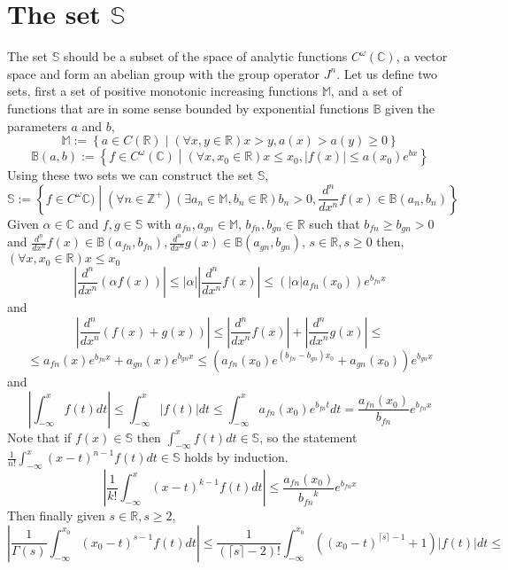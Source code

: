 \documentclass[%
 onecolumn,
 amsmath, amssymb, aps, pra, 10pt
]{revtex4-2}
\begin{document}
\appendix*

\section{The set $\mathbb{S}$}
The set $\mathbb{S}$ should be a subset of the space of analytic functions $C^\omega(\mathbb{C})$, a vector space and form an abelian group with the group operator $J^n$. Let us define two sets, first a set of positive monotonic increasing functions $\mathbb{M}$, and a set of functions that are in some sense bounded by exponential functions $\mathbb{B}$ given the parameters $a$ and $b$,
\[\mathbb{M} := \left\lbrace a \in C(\mathbb{R}) \middle| (\forall x, y \in \mathbb{R}) x > y, a(x) > a(y) \geq 0 \right\rbrace\]
\[\mathbb{B}(a, b) := \left\lbrace f \in C^\omega(\mathbb{C}) \middle| (\forall x, x_0 \in \mathbb{R}) x \leq x_0, |f(x)| \leq a(x_0)e^{bx} \right\rbrace\]
Using these two sets we can construct the set $\mathbb{S}$,
\[
\mathbb{S} := \left\lbrace f \in C^\omega\mathbb{C}) \middle| (\forall n \in \mathbb{Z}^+)(\exists a_n \in \mathbb{M}, b_n \in \mathbb{R}) b_n > 0, \frac{d^n}{dx^n}f(x) \in \mathbb{B}(a_n, b_n) \right\rbrace
\]
Given $\alpha \in \mathbb{C}$ and $f, g \in \mathbb{S}$ with $a_{fn}, a_{gn} \in \mathbb{M}$, $ b_{fn}, b_{gn} \in \mathbb{R}$ such that $b_{fn} \geq b_{gn} > 0$ and $\frac{d^n}{dx^n} f(x) \in \mathbb{B}(a_{fn}, b_{fn}), \frac{d^n}{dx^n} g(x) \in \mathbb{B}(a_{gn}, b_{gn})$, $s \in \mathbb{R}, s \geq 0$ then, $(\forall x, x_0 \in \mathbb{R}) x \leq x_0$
\[\left|\frac{d^n}{dx^n} (\alpha f(x))\right| \leq |\alpha| \left|\frac{d^n}{dx^n}f(x)\right| \leq (|\alpha| a_{fn}(x_0))e^{b_{fn}x}\]
and
\[\left|\frac{d^n}{dx^n}(f(x) + g(x))\right| \leq \left|\frac{d^n}{dx^n} f(x)\right| + \left|\frac{d^n}{dx^n} g(x)\right| \leq \]
\[\leq a_{fn}(x)e^{b_{fn}x} + a_{gn}(x)e^{b_{gn}x} \leq \left(a_{fn}(x_0)e^{(b_{fn} - b_{gn})x_0} + a_{gn}(x_0)\right)e^{b_{gn}x}\]
and
\[\left|\int_{-\infty}^x f(t)dt\right| \leq \int_{-\infty}^x \left|f(t)\right| dt \leq \int_{-\infty}^x a_{fn}(x_0)e^{b_{fn}t}dt = \frac{a_{fn}(x_0)}{b_{fn}}e^{b_{fn}x}\]
Note that if $f(x) \in \mathbb{S}$ then $\int_{-\infty}^x f(t)dt \in \mathbb{S}$, so the statement $\frac{1}{n!}\int_{-\infty}^x (x - t)^{n - 1}f(t)dt \in \mathbb{S}$ holds by induction.
\[\left|\frac{1}{k!}\int_{-\infty}^x (x - t)^{k - 1}f(t)dt\right| \leq \frac{a_{fn}(x_0)}{{b_{fn}}^k}e^{b_{fn}x}\]
Then finally given $s \in \mathbb{R}, s \geq 2$,
\[\left|\frac{1}{\Gamma(s)} \int_{-\infty}^{x_0} (x_0 - t)^{s-1} f(t)dt\right| \leq \frac{1}{(\lceil s \rceil - 2)!} \int_{-\infty}^{x_0} \left((x_0 - t)^{\lceil s \rceil -1} + 1\right) \left|f(t)\right|dt \leq \]
\end{document}
